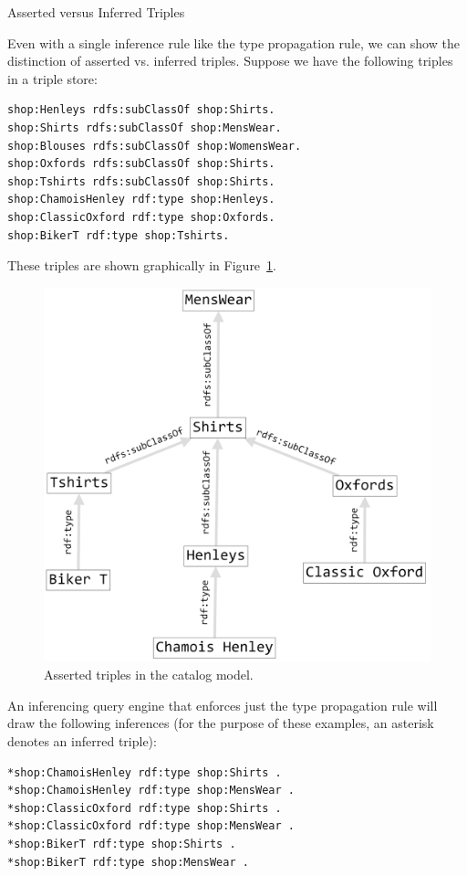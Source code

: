 \begin{example}{Asserted versus Inferred Triples}

Even with a single inference rule like the type propagation rule, we can
show the distinction of asserted vs. inferred triples. Suppose we have
the following triples in a triple store:

\begin{lstlisting}
shop:Henleys rdfs:subClassOf shop:Shirts. 
shop:Shirts rdfs:subClassOf shop:MensWear. 
shop:Blouses rdfs:subClassOf shop:WomensWear.
shop:Oxfords rdfs:subClassOf shop:Shirts. 
shop:Tshirts rdfs:subClassOf shop:Shirts. 
shop:ChamoisHenley rdf:type shop:Henleys.
shop:ClassicOxford rdf:type shop:Oxfords. 
shop:BikerT rdf:type shop:Tshirts.
\end{lstlisting}

These triples are shown graphically in Figure~\ref{fig:ch7.2}.

\begin{figure}
\centering
\includegraphics[width=5in]{SWWOv3/media/ch7/figure7-2.png}
\caption{Asserted triples in the catalog model.}
\label{fig:ch7.2}
\end{figure}

An inferencing query engine that enforces just the type propagation rule
will draw the following inferences (for the purpose of these examples, an asterisk denotes an inferred triple):

\begin{lstlisting}
*shop:ChamoisHenley rdf:type shop:Shirts .
*shop:ChamoisHenley rdf:type shop:MensWear .
*shop:ClassicOxford rdf:type shop:Shirts .
*shop:ClassicOxford rdf:type shop:MensWear .
*shop:BikerT rdf:type shop:Shirts .
*shop:BikerT rdf:type shop:MensWear .
\end{lstlisting}


\end{example}
